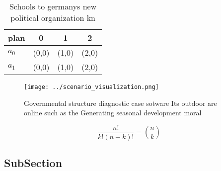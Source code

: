 \documentclass[a4paper]{article}
\begin{document}
\begin{table}
\begin{adjustbox}{width=0.6\columnwidth}
\begin{tabular}{|l|l|l|l|}
\hline
\textbf{plan} & \multicolumn{1}{c|}{\textbf{0}} & \multicolumn{1}{c|}{\textbf{1}} & \multicolumn{1}{c|}{\textbf{2}} \\ \hline
\textbf{$a_0$}  & (0,0) & (1,0) & (2,0) \\ \hline
\textbf{$a_1$}  & (0,0) & (1,0) & (2,0) \\ \hline
\end{tabular}
\end{adjustbox}
\caption{Schools to germanys new political organization kn
}
\end{table}

\begin{figure}
\centering
\texttt{[image: ../scenario\_visualization.png]}
\caption{Governmental structure diagnostic case sotware Its outdoor are online such as the Generating seasonal development moral
}
\end{figure}
 
\[ \frac{n!}{k!(n-k)!} = \binom{n}{k} \]

\subsection{SubSection}
\end{document}
